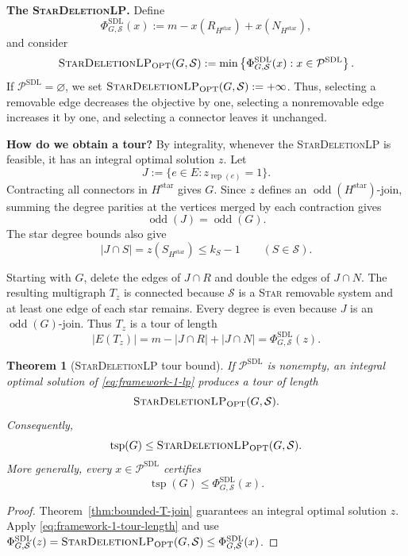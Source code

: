 \documentclass[11pt]{amsart}
\DeclareMathOperator{\odd}{odd}
\newcommand{\rep}[1]{\operatorname{rep}(#1)}
\newcommand{\1}{\mathbbm{1}}
\newcommand{\LPone}{\textsc{StarDeletionLP}}
\newcommand{\Pone}{\mathcal P^{\mathrm{SDL}}}
\newcommand{\PhiOne}{\Phi^{\mathrm{SDL}}}
\newtheorem{theorem}{Theorem}[section]
\begin{document}
\textbf{The \LPone.}
Define
\[
    \PhiOne_{G,\mathcal S}(x)
    :=m-x(R_{H^{\mathrm{star}}})+x(N_{H^{\mathrm{star}}}),
\]
and consider
\begin{equation}
\label{eq:framework-1-lp}
    \text{\LPone}_{\mathrm{OPT}}(G,\mathcal S)
    :=\min\left\{
        \PhiOne_{G,\mathcal S}(x):x\in\Pone
    \right\}.
\end{equation}
If $\Pone=\varnothing$, we set
$\text{\LPone}_{\mathrm{OPT}}(G,\mathcal S):=+\infty$.
Thus, selecting a removable edge decreases the objective by one,
selecting a nonremovable edge increases it by one, and selecting
a connector leaves it unchanged.

\textbf{How do we obtain a tour?}
By integrality, whenever the \LPone{} is feasible,
it has an integral optimal solution $z$. Let
\[
    J:=\{e\in E:z_{\rep{e}}=1\}.
\]
Contracting all connectors in $H^{\mathrm{star}}$ gives $G$.
Since $z$ defines an $\odd(H^{\mathrm{star}})$-join, summing
the degree parities at the vertices merged by each contraction
gives
\begin{equation}
\label{eq:projected-parity}
    \odd(J)=\odd(G).
\end{equation}
The star degree bounds also give
\[
    |J\cap S|=z(S_{H^{\mathrm{star}}})\le k_S-1
    \qquad(S\in\mathcal S).
\]

Starting with $G$, delete the edges of $J\cap R$ and double
the edges of $J\cap N$. The resulting multigraph $T_z$
is connected because $\mathcal S$ is a \textsc{Star} removable system
and at least one edge of each star remains. Every degree
is even because $J$ is an $\odd(G)$-join.
Thus $T_z$ is a tour of length
\begin{equation}
\label{eq:framework-1-tour-length}
    |E(T_z)|
    =m-|J\cap R|+|J\cap N|
    =\PhiOne_{G,\mathcal S}(z).
\end{equation}
\begin{theorem}[\LPone{} tour bound]
\label{thm:framework-1-bound}
If $\Pone$ is nonempty, an integral optimal solution of
\eqref{eq:framework-1-lp} produces a tour of length
\[
    \text{\LPone}_{\mathrm{OPT}}(G,\mathcal S).
\]
Consequently,
\[
    \operatorname{tsp}(G)\le \text{\LPone}_{\mathrm{OPT}}(G,\mathcal S).
\]
More generally, every $x\in \Pone$ certifies
\[
    \operatorname{tsp}(G)\le \PhiOne_{G,\mathcal S}(x).
\]
\end{theorem}

\begin{proof}
Theorem~\ref{thm:bounded-T-join} guarantees an integral
optimal solution $z$. Apply \eqref{eq:framework-1-tour-length}
and use $\PhiOne_{G,\mathcal S}(z)=\text{\LPone}_{\mathrm{OPT}}(G,\mathcal S)\le\PhiOne_{G,\mathcal S}(x)$.
\end{proof}
\end{document}
